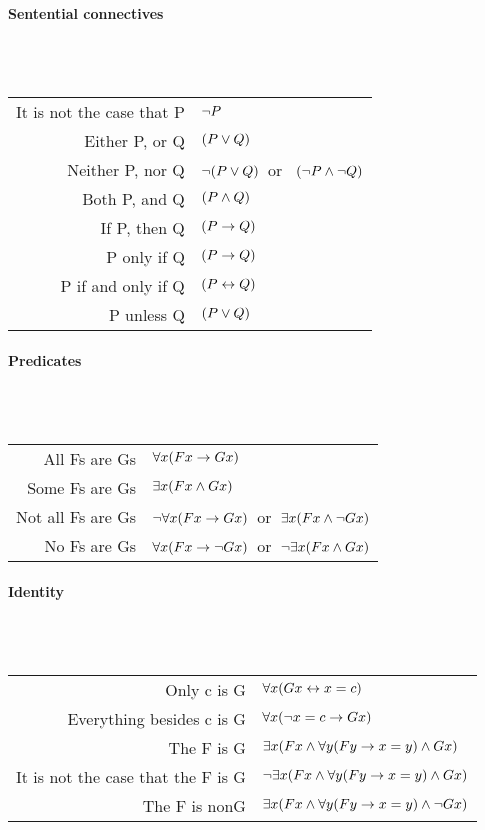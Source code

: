 \paragraph{Sentential connectives}~\\

\hspace{1cm}~\begin{tabular}{rl} \toprule
It is not the case that P & $\neg P$\\
Either P, or Q & $(P \vee Q)$\\
Neither P, nor Q & $\neg(P \vee Q)$\ or \ $(\neg P \wedge \neg Q)$\\
Both P, and Q & $(P \wedge Q)$\\
If P, then Q & $(P \rightarrow Q)$\\
P only if Q & $(P \rightarrow Q)$\\
P if and only if Q & $(P \leftrightarrow Q)$\\
P unless Q & $(P \vee Q)$\\
\bottomrule\end{tabular}

\paragraph{Predicates}~\\

\hspace{1cm}~\begin{tabular}{rl} \toprule
All Fs are Gs & $\forall x(Fx \rightarrow Gx)$\\
Some Fs are Gs & $\exists x(Fx \wedge Gx)$\\
Not all Fs are Gs & $\neg\forall x(Fx \rightarrow Gx)$\ or\ $\exists x(Fx \wedge \neg Gx)$\\
No Fs are Gs & $\forall x(Fx \rightarrow\neg Gx)$\ or\ $\neg\exists x(Fx \wedge Gx)$\\
\bottomrule\end{tabular}

\newpage\paragraph{Identity}~\\

\hspace{1cm}~\begin{tabular}{rl} \toprule
Only c is G & $\forall x(Gx \leftrightarrow x=c)$\\
Everything besides c is G & $\forall x(\neg x = c \rightarrow Gx)$\\
The F is G & $\exists x(Fx \wedge \forall y(Fy \rightarrow x=y) \wedge Gx)$\\
It is not the case that the F is G & $\neg\exists x(Fx \wedge \forall y(Fy \rightarrow x=y) \wedge Gx)$\\
The F is nonG & $\exists x(Fx \wedge \forall y(Fy \rightarrow x=y) \wedge \neg Gx)$\\\bottomrule
\end{tabular}

